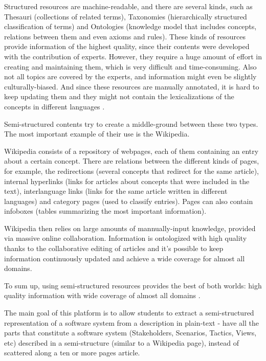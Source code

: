 \documentclass{llncs}
\begin{document}
Structured resources are machine-readable, and there are several kinds, such as Thesauri (collections of related terms), Taxonomies (hierarchically structured classification of terms) and Ontologies (knowledge model that includes concepts, relations between them and even axioms and rules). These kinds of resources provide information of the highest quality, since their contents were developed with the contribution of experts. However, they require a huge amount of effort in creating and maintaining them, which is very difficult and time-consuming. Also not all topics are covered by the experts, and information might even be slightly culturally-biased. And since these resources are manually annotated, it is hard to keep updating them and they might not contain the lexicalizations of the concepts in different languages \cite{hovy2013collaboratively}.

Semi-structured contents try to create a middle-ground between these two types. The most important example of their use is the Wikipedia. 

Wikipedia consists of a repository of webpages, each of them containing an entry about a certain concept. There are relations between the different kinds of pages, for example, the redirections (several concepts that redirect for the same article), internal hyperlinks (links for articles about concepts that were included in the text), interlanguage links (links for the same article written in different languages) and category pages (used to classify entries). Pages can also contain infoboxes (tables summarizing the most important information).

Wikipedia then relies on large amounts of mannually-input knowledge, provided via massive online collaboration. Information is ontologized with high quality thanks to the collaborative editing of articles and it's possible to keep information continuously updated and achieve a wide coverage for almost all domains. 

To sum up, using semi-structured resources provides the best of both worlds: high quality information with wide coverage of almost all domains \cite{hovy2013collaboratively}.

The main goal of this platform is to allow students to extract a semi-structured representation of a software system from a description in plain-text - have all the parts that constitute a software system (Stakeholders, Scenarios, Tactics, Views, etc) described in a semi-structure (similar to a Wikipedia page), instead of scattered along a ten or more pages article. 
\end{document}
